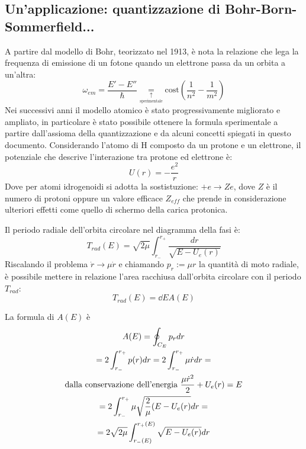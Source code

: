 \documentclass[Main.tex]{subfiles}
\begin{document}
\subsection{Un'applicazione: quantizzazione di Bohr-Born-
Sommerfield...}
A partire dal modello di Bohr, teorizzato nel 1913, è nota la relazione che lega la frequenza di emissione di un fotone quando un elettrone passa da un orbita a un'altra:
\begin{equation}
	\omega_{em} = \frac{E'-E''}{\hbar} \underset{\underset{\text{sperimentale}}{\uparrow}}{=} \text{cost} \left( \frac{1}{n^2} - \frac{1}{m^2} \right)
\end{equation}
Nei successivi anni il modello atomico è stato progressivamente migliorato e ampliato, in particolare è stato possibile ottenere la formula sperimentale a partire dall'assioma della quantizzazione e da alcuni concetti spiegati in questo documento. Considerando l'atomo di H composto da un protone e un elettrone, il potenziale che descrive l'interazione tra protone ed elettrone è:
\begin{equation}
	U(r) = - \frac{e^2}{r}
\end{equation}
Dove per atomi idrogenoidi si adotta la sostistuzione: $+e \rightarrow Ze$, dove $Z$ è il numero di protoni oppure un valore efficace $Z_{eff}$ che prende in considerazione ulteriori effetti come quello di schermo della carica protonica.

Il periodo radiale dell'orbita circolare nel diagramma della fasi è:
\begin{equation}
	T_{rad} (E) = \sqrt{2 \mu} \int_{r_-}^{r_+} \frac{dr}{\sqrt{E-U_e(r)}}
\end{equation} 
Riscalando il problema $\dot r \rightarrow \mu \dot r$ e chiamando $p_r:= \mu r$ la quantità di moto radiale, è possibile mettere in relazione l'area racchiusa dall'orbita circolare con il periodo $T_{rad}$:
\begin{equation}
	T_{rad}(E)= \dd{}{E}A(E)
\end{equation}


La formula di $A(E)$ è 
\begin{gather}
	A(E) = \oint_{C_E} p_rdr \\= 2 \int_{r_-}^{r_+} p(r) dr = 2 \int_{r_-}^{r_+} \mu \dot r dr= \\
	\notag \text{dalla conservazione dell'energia } \frac{\mu \dot r^2}{2} + U_e(r) =E\\
	=2 \int_{r_-}^{r_+} \mu \sqrt{\frac{2}{\mu} (E-U_e(r)} dr=\\
	=2 \sqrt{2 \mu} \int_{r_-(E)}^{r_+(E)} \sqrt{E-U_e(r)}dr
\end{gather}
\end{document}
